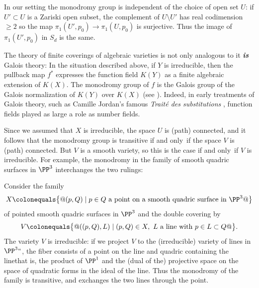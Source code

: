 \begin{fact}\label{Galois equals monodromy}
In our setting  the monodromy group is independent of the choice of open
set $U$: if $U' \subset U$ is a Zariski open subset, the complement of
$U\setminus U'$ has
real codimension $\geq 2$ so the map $\pi_1(U', p_0) \to \pi_1(U,p_0)$
is surjective. Thus the image of $\pi_1(U', p_0)$ in $S_d$ is the same.

The theory of finite coverings of algebraic varieties is not only
analogous to
%
it \emph{\bfseries{is}} Galois theory: In the situation
described above, if $Y$ is irreducible, then the pullback map $f^*$
expresses the function field $K(Y)$ as a finite algebraic extension of
$K(X)$. The monodromy group of $f$  is the Galois group of the Galois
%
normalization of $K(Y)$ over $K(X)$ (see \cite{Harris1979}). Indeed,
in early treatments of Galois theory, such as
Camille Jordan's
famous \emph{Trait\'e
%
des substitutions} \citeyear{MR1188877},
function fields played as large a role as number fields.
%
%
\end{fact}

Since we assumed that $X$ is irreducible, the space $U$ is (path)
connected, and it follows that the monodromy group is transitive if and
%
only~if the space $V$ is (path) connected. But $V$ is a smooth
variety, so this is the case if and only~if $V$ is irreducible. For
example, the monodromy in the family
of
smooth quadric surfaces in $\PP^3$
interchanges the two
rulings:
%
%

\begin{example}\label{monodromy of rulings}
Consider the family
$$
X \colonequals  \big\{@(p,Q) \mid p\in Q\hbox{ a point on a smooth quadric
surface in $\PP^3$}@\big\}
$$
of pointed smooth quadric surfaces in $\PP^3$ and the double covering by
$$
V\colonequals  \big\{@((p,Q), L)\mid (p,Q)\in X,\ L \hbox{ a line with $p
\in L\subset Q$}@\big\}.
$$
The variety $V$ is irreducible: if we project $V$ to the (irreducible)
variety of lines in $\PP^3` `$,
the fiber consists of a point on the line and quadric containing the
line\emdash that is, the product
of $\PP^1$ and the (dual of the) projective space
on the space of quadratic forms in the ideal of the line. Thus the
monodromy of the family
is transitive, and exchanges the two lines through the point.
\end{example}

